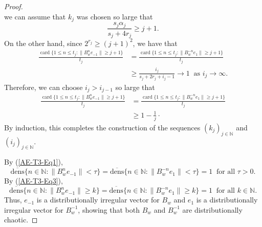 \documentclass[12pt]{amsart}
\theoremstyle{theorem}
\theoremstyle{definition}
\theoremstyle{remark} \theoremstyle{question} \theoremstyle{example}
\newcommand{\N}{\mathbb{N}}   %
\newcommand{\card}{\operatorname{card}}
\newcommand{\udens}{\operatorname{\overline{dens}}}
\begin{document}
\begin{proof}
\[\]
we can assume that $k_j$ was chosen so large that
\begin{equation}\label{AE-T3-Eq2}
\frac{s_j \alpha_j}{s_j + 4 r_j} \geq j+1.
\end{equation}
On the other hand, since $2^{r_j} \geq (j+1)^2$, we have that
\begin{align*}
\frac{\card\{1 \leq n \leq t_j : \|B_w^n e_{-1}\| \geq j+1\}}{t_j}
&= \frac{\card\{1 \leq n \leq t_j : \|B_w^{-n} e_1\| \geq j+1\}}{t_j}\\
&\geq \frac{i_j}{s_j + 2r_j + i_j - 1} \to 1 \ \text{ as } i_j \to \infty.
\end{align*}
Therefore, we can choose $i_j > i_{j-1}$ so large that
\begin{align}\label{AE-T3-Eq3}
\frac{\card\{1 \leq n \leq t_j : \|B_w^n e_{-1}\| \geq j+1\}}{t_j}
&= \frac{\card\{1 \leq n \leq t_j : \|B_w^{-n} e_1\| \geq j+1\}}{t_j}\\
&\geq 1 - \frac{1}{j}\cdot \nonumber
\end{align}
By induction, this completes the construction of the sequences $(k_j)_{j \in \N}$ and $(i_j)_{j \in \N}$.

By (\ref{AE-T3-Eq1}),
\[
\udens\{n \in \N : \|B_w^n e_{-1}\| < \tau\} = \udens\{n \in \N : \|B_w^{-n} e_1\| < \tau\} = 1 \ \text{ for all } \tau > 0.
\]
By (\ref{AE-T3-Eq3}),
\[
\udens\{n \in \N : \|B_w^n e_{-1}\| \geq k\} = \udens\{n \in \N : \|B_w^{-n} e_1\| \geq k\} = 1 \ \text{ for all } k \in \N.
\]
Thus, $e_{-1}$ is a distributionally irregular vector for $B_w$ and $e_1$ is a distributionally irregular vector for $B_w^{-1}$,
showing that both $B_w$ and $B_w^{-1}$ are distributionally chaotic.


\end{proof}
\end{document}
